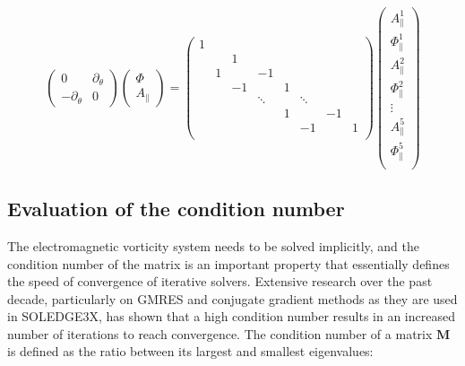 \begin{equation}
	\begin{pmatrix}
		0 & \partial_\theta \\
		-\partial_\theta  & 0 
	\end{pmatrix}\begin{pmatrix}
	\Phi \\ A_\parallel
	\end{pmatrix} =
	\begin{pmatrix}
		1  & & & & & &     \\		
		   & & 1 & & & & & \\
		& 1 & & -1 & & & & \\
		& & -1 & & 1 & & & \\
		& &  & \ddots & & \ddots & & \\
		& & & & 1 & & -1 & \\
		& & & & & -1 & & 1 \\
	\end{pmatrix}
	\begin{pmatrix}
		A_\parallel^1    \\
		\Phi_\parallel^1 \\
		A_\parallel^2    \\
		\Phi_\parallel^2 \\
		\vdots           \\
		A_\parallel^5    \\
		\Phi_\parallel^5 \\		
	\end{pmatrix}
\end{equation}




\subsection{Evaluation of the condition number}

The electromagnetic vorticity system needs to be solved implicitly, and the condition number of the matrix is an important property that essentially defines the speed of convergence of iterative solvers. Extensive research over the past decade\cite{pyzara2011influence, strakos1991linear, drkovsova1995numerical, greenbaum1997numerical}, particularly on GMRES and conjugate gradient methods as they are used in SOLEDGE3X, has shown that a high condition number results in an increased number of iterations to reach convergence. The condition number of a matrix $\textbf{M}$ is defined as the ratio between its largest and smallest eigenvalues:

